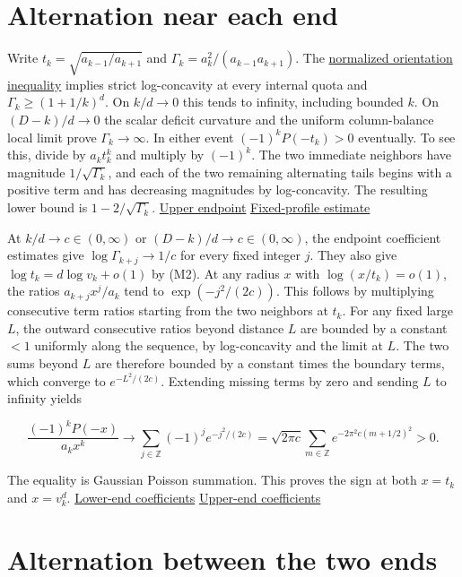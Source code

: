 \section{Alternation near each end}

Write $t_k=\sqrt{a_{k-1}/a_{k+1}}$ and $\Gamma_k=a_k^2/(a_{k-1}a_{k+1})$. The \href{https://github.com/ProgramComputer/open-math-research/blob/ba7ddfd7efb37cac33769f4fdfed749e1b5bf58a/topics/balanced-arrays/orientation-normalization.md}{normalized orientation inequality} implies strict log-concavity at every internal quota and $\Gamma_k\ge(1+1/k)^d$. On $k/d\to0$ this tends to infinity, including bounded $k$. On $(D-k)/d\to0$ the scalar deficit curvature and the uniform column-balance local limit prove $\Gamma_k\to\infty$. In either event $(-1)^kP(-t_k)>0$ eventually. To see this, divide by $a_kt_k^k$ and multiply by $(-1)^k$. The two immediate neighbors have magnitude $1/\sqrt{\Gamma_k}$, and each of the two remaining alternating tails begins with a positive term and has decreasing magnitudes by log-concavity. The resulting lower bound is $1-2/\sqrt{\Gamma_k}$. \hyperref[sec:upper]{Upper endpoint} \enspace \hyperref[sec:profiles]{Fixed-profile estimate}

At $k/d\to c\in(0,\infty)$ or $(D-k)/d\to c\in(0,\infty)$, the endpoint coefficient estimates give $\log\Gamma_{k+j}\to1/c$ for every fixed integer $j$. They also give $\log t_k=d\log v_k+o(1)$ by (M2). At any radius $x$ with $\log(x/t_k)=o(1)$, the ratios $a_{k+j}x^j/a_k$ tend to $\exp(-j^2/(2c))$. This follows by multiplying consecutive term ratios starting from the two neighbors at $t_k$. For any fixed large $L$, the outward consecutive ratios beyond distance $L$ are bounded by a constant $<1$ uniformly along the sequence, by log-concavity and the limit at $L$. The two sums beyond $L$ are therefore bounded by a constant times the boundary terms, which converge to $e^{-L^2/(2c)}$. Extending missing terms by zero and sending $L$ to infinity yields

\begin{equation*}
\frac{(-1)^kP(-x)}{a_kx^k}
\longrightarrow \sum_{j\in\mathbb Z}(-1)^j e^{-j^2/(2c)}
=\sqrt{2\pi c}\sum_{m\in\mathbb Z}e^{-2\pi^2c(m+1/2)^2}>0 .
\end{equation*}

The equality is Gaussian Poisson summation. This proves the sign at both $x=t_k$ and $x=v_k^d$. \hyperref[sec:lower]{Lower-end coefficients} \enspace \hyperref[sec:upper]{Upper-end coefficients}

\section{Alternation between the two ends}

